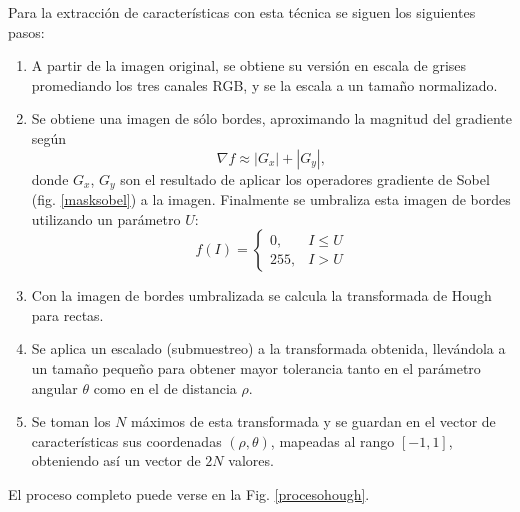 \documentclass[conference,a4paper,10pt,oneside,final]{tfmpd}
\begin{document}
Para la extracción de características con esta técnica se siguen los siguientes
pasos:
\begin{enumerate}
\item A partir de la imagen original, se obtiene su versión en escala de grises
      promediando los tres canales RGB, y se la escala a un tamaño normalizado.
\item Se obtiene una imagen de sólo bordes, aproximando la magnitud del
      gradiente según
      \begin{equation}
      \label{sob}
      \nabla f \approx |G_x| + |G_y|,
      \end{equation}
      donde $G_x$, $G_y$ son el resultado de aplicar los o\-pe\-ra\-do\-res
      gradiente  de Sobel \cite{gonzalez+woods} (fig. \ref{masksobel}) a la
      imagen. 
      Finalmente se umbraliza esta imagen de bordes utilizando un parámetro $U$:
      \begin{equation}
      \label{umbral}
      f(I)=
      \begin{cases}
      0, & I\leq U\\
      255, & I > U
      \end{cases}
      \end{equation}
\item Con la imagen de bordes umbralizada se calcula la transformada de
      Hough para rectas.
\item Se aplica un escalado (submuestreo) a la transformada obtenida, llevándola
      a un tamaño pequeño %
      para obtener mayor tolerancia tanto en el parámetro angular
      $\theta$ como en el de distancia $\rho$.
\item Se toman los $N$ máximos de esta transformada y se guardan en el vector de
      características sus coordenadas $(\rho,\theta)$, mapeadas al rango
      $[-1,1]$, obteniendo así un vector de $2N$ valores.
\end{enumerate}
El proceso completo puede verse en la Fig. \ref{procesohough}.
\end{document}
